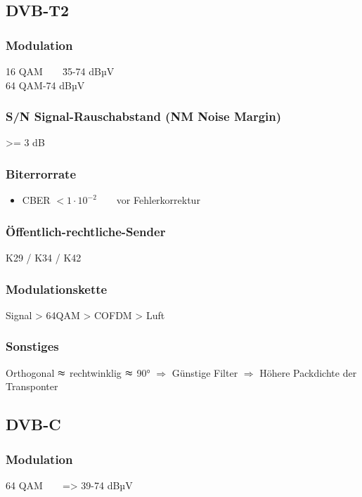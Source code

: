 \documentclass[12pt,a4paper]{article}
\begin{document}
\subsection{DVB-T2}
\subsubsection{Modulation}
\begin{tabbing}
16 QAM~~~~\= 35-74 dBµV \\
64 QAM-74 dBµV \\
\end{tabbing}

\subsubsection{S/N Signal-Rauschabstand (NM Noise Margin)}
>= 3 dB

\subsubsection{Biterrorrate}
\begin{itemize}
\item CBER $<1 \cdot 10^{-2}$~~~~vor Fehlerkorrektur 
\end{itemize}

\subsubsection{Öffentlich-rechtliche-Sender}
K29 / K34 / K42

\subsubsection{Modulationskette}
Signal > 64QAM > COFDM > Luft

\subsubsection{Sonstiges}
Orthogonal $\thickapprox$ rechtwinklig $\thickapprox$ 90°
$\Rightarrow$ Günstige Filter
$\Rightarrow$ Höhere Packdichte der Transponter

\subsection{DVB-C}
\subsubsection{Modulation}
\begin{tabbing}
64 QAM~~~~=> 39-74 dBµV 
\end{tabbing}
\end{document}
